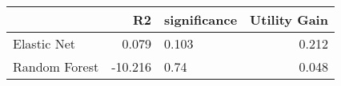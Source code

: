 \begin{tabular}{lrlr}
\toprule
{} &      R2 & significance &  Utility Gain \\
\midrule
Elastic Net   &   0.079 &       0.103  &         0.212 \\
Random Forest & -10.216 &        0.74  &         0.048 \\
\bottomrule
\end{tabular}
